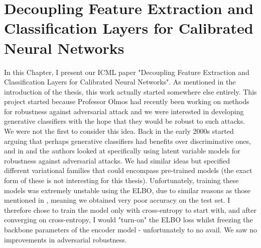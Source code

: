 \chapter{Decoupling Feature Extraction and Classification Layers for Calibrated Neural Networks}
\label{chap:ICML}
In this Chapter, I present our ICML paper "Decoupling Feature Extraction and Classification Layers for Calibrated Neural Networks". As mentioned in the introduction of the thesis, this work actually started somewhere else entirely. This project started because Professor Olmos had recently been working on methods for robustness against adversarial attack and we were interested in developing generative classifiers with the hope that they would be robust to such attacks. We were not the first to consider this idea. Back in the early 2000s \cite{NIPS2001_7b7a53e2} started arguing that perhaps generative classifiers had benefits over discriminative ones, and in \cite{Schott2018TowardsTF} and \cite{li2019are} the authors looked at specifically using latent variable models for robustness against adversarial attacks. We had similar ideas but specified different variational families that could encompass pre-trained models (the exact form of these is not interesting for this thesis). Unfortunately, training these models was extremely unstable using the ELBO, due to similar reasons as those mentioned in \cite{fetaya2020understanding}, meaning we obtained very poor accuracy on the test set. I therefore chose to train the model only with cross-entropy to start with, and after converging on cross-entropy, I would "turn-on" the ELBO loss whilst freezing the backbone parameters of the encoder model - unfortunately to no avail. We saw no improvements in adversarial robustness. \\

